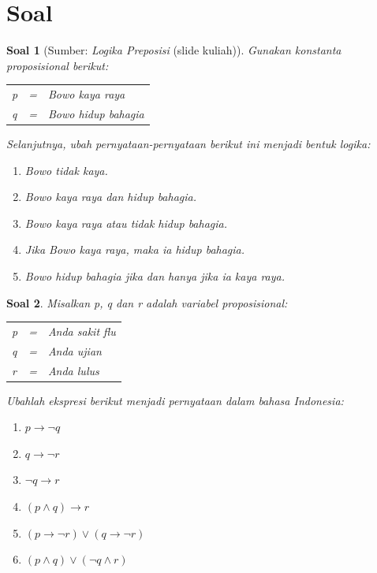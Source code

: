 \documentclass[12pt,a4paper]{article}
\theoremstyle{soaljarak}
\newtheorem{soal}{Soal}
\begin{document}
\section*{Soal}

\begin{soal}[\normalfont Sumber: \textit{Logika Preposisi} (slide kuliah)]
  Gunakan konstanta proposisional berikut:
  \begin{center}
    \begin{tabular}{l c l}
      \textit{p} & = & Bowo kaya raya\\
      \textit{q} & = & Bowo hidup bahagia
    \end{tabular}
  \end{center}
  Selanjutnya, ubah pernyataan-pernyataan berikut ini menjadi bentuk logika:
  \begin{enumerate}
    \item Bowo tidak kaya.
    \item Bowo kaya raya dan hidup bahagia.
    \item Bowo kaya raya atau tidak hidup bahagia.
    \item Jika Bowo kaya raya, maka ia hidup bahagia.
    \item Bowo hidup bahagia jika dan hanya jika ia kaya raya.
  \end{enumerate}
\end{soal}

\begin{soal}
  Misalkan \textit{p}, \textit{q} dan \textit{r} adalah variabel proposisional:
  \begin{center}
    \begin{tabular}{l c l}
      \textit{p} & = & Anda sakit flu\\
      \textit{q} & = & Anda ujian\\
      \textit{r} & = & Anda lulus
    \end{tabular}
  \end{center}
  Ubahlah ekspresi berikut menjadi pernyataan dalam bahasa Indonesia:
  \begin{enumerate}
    \item $p \rightarrow \neg q$
    \item $q \rightarrow \neg r$
    \item $\neg q \rightarrow r$
    \item $(p \wedge q) \rightarrow r$
    \item $(p \rightarrow \neg r) \vee (q \rightarrow \neg r)$
    \item $(p \wedge q) \vee (\neg q \wedge r)$
  \end{enumerate}
\end{soal}
\end{document}
